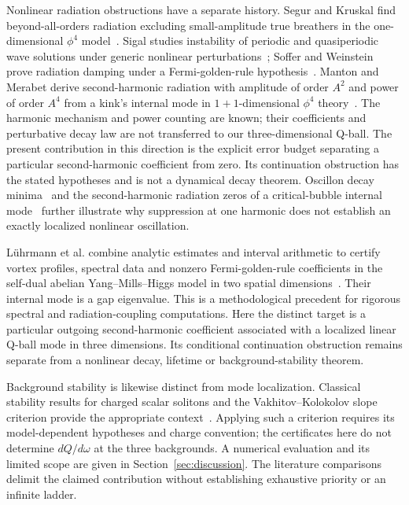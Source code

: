 Nonlinear radiation obstructions have a separate history. Segur and
Kruskal find beyond-all-orders radiation excluding small-amplitude true
breathers in the one-dimensional $\phi^4$
model~\cite{SegurKruskal1987}. Sigal studies instability of periodic and
quasiperiodic wave solutions under generic nonlinear
perturbations~\cite{Sigal1993}; Soffer and Weinstein prove radiation
damping under a Fermi-golden-rule hypothesis~\cite{SofferWeinstein1999}.
Manton and Merabet derive second-harmonic radiation with amplitude of
order $A^2$ and power of order $A^4$ from a kink's internal mode in
$1+1$-dimensional $\phi^4$ theory~\cite[Appendix A]{MantonMerabet1997}.
The harmonic mechanism and power counting are known; their coefficients
and perturbative decay law are not transferred to our three-dimensional
Q-ball.
The present contribution in this direction is the explicit error budget
separating a particular second-harmonic coefficient from zero. Its
continuation obstruction has the stated hypotheses and is not a
dynamical decay theorem. Oscillon decay minima~\cite{ZhangOscillons2020}
and the second-harmonic radiation zeros of a critical-bubble internal
mode~\cite{InagakiMurakami2026} further illustrate why suppression at one
harmonic does not establish an exactly localized nonlinear oscillation.

L\"uhrmann et al. combine analytic estimates and interval arithmetic to
certify vortex profiles, spectral data and nonzero Fermi-golden-rule
coefficients in the self-dual abelian Yang--Mills--Higgs model in two
spatial dimensions~\cite[Theorem 1.1, Remark 1.2 and Section 2]{LuhrmannEtAl2026}.
Their internal mode is a gap eigenvalue. This is a methodological
precedent for rigorous spectral and radiation-coupling computations.
Here the distinct target is a particular outgoing second-harmonic
coefficient associated with a localized linear Q-ball mode in three
dimensions. Its conditional continuation obstruction remains separate
from a nonlinear decay, lifetime or background-stability theorem.

Background stability is likewise distinct from mode localization.
Classical stability results for charged scalar solitons and the
Vakhitov--Kolokolov slope criterion provide the appropriate
context~\cite{FriedbergLeeSirlin1976,VakhitovKolokolov1973}.
Applying such a criterion requires its model-dependent hypotheses and
charge convention; the certificates here do not determine $dQ/d\omega$
at the three backgrounds. A numerical evaluation and its limited scope
are given in Section~\ref{sec:discussion}. The literature comparisons delimit the claimed
contribution without establishing exhaustive priority or an infinite
ladder.
